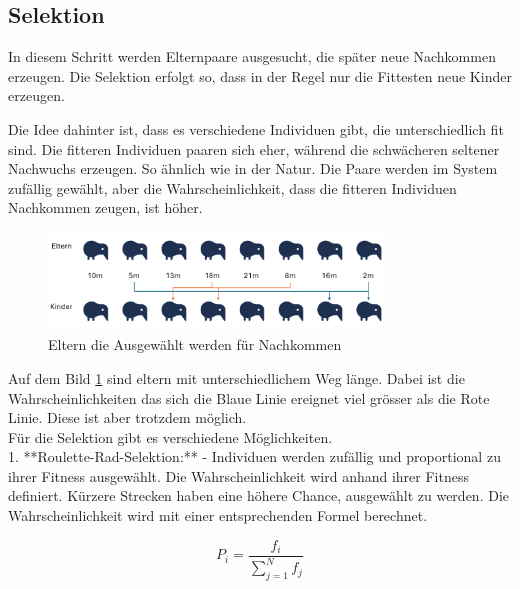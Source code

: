 %
%
%
%
\subsection{Selektion
\label{buch:paper:varalg:subsection:selection}}
In diesem Schritt werden Elternpaare ausgesucht, die später 
neue Nachkommen erzeugen. Die Selektion erfolgt so, dass in der 
Regel nur die Fittesten neue Kinder erzeugen.

Die Idee dahinter ist, dass es verschiedene Individuen gibt, 
die unterschiedlich fit sind. Die fitteren Individuen paaren 
sich eher, während die schwächeren seltener Nachwuchs erzeugen. 
So ähnlich wie in der Natur. Die Paare werden im System zufällig 
gewählt, aber die Wahrscheinlichkeit, dass die fitteren 
Individuen Nachkommen zeugen, ist höher.

\begin{figure}
    \centering
    \includegraphics[width=0.8\textwidth]{
        papers/varalg/images/teil3/04OffspringProbability.png
    }
    \caption{Eltern die Ausgewählt werden für Nachkommen}
    \label{fig:selection_of_parents}
\end{figure}

Auf dem Bild \ref{fig:selection_of_parents} sind eltern mit unterschiedlichem
Weg länge. Dabei ist die Wahrscheinlichkeiten das sich die Blaue Linie ereignet 
viel grösser als die Rote Linie. Diese ist aber trotzdem möglich.
\\
Für die Selektion gibt es verschiedene Möglichkeiten.
\\
1. **Roulette-Rad-Selektion:** 
- Individuen werden zufällig und proportional zu ihrer 
Fitness ausgewählt. Die Wahrscheinlichkeit wird anhand ihrer 
Fitness definiert. Kürzere Strecken haben eine höhere Chance, 
ausgewählt zu werden. Die Wahrscheinlichkeit wird mit einer 
entsprechenden Formel berechnet.

\begin{equation}
    \label{eq:probability_fittest}
    P_i = \frac{f_i}{\sum_{j=1}^{N} f_j}
\end{equation}

